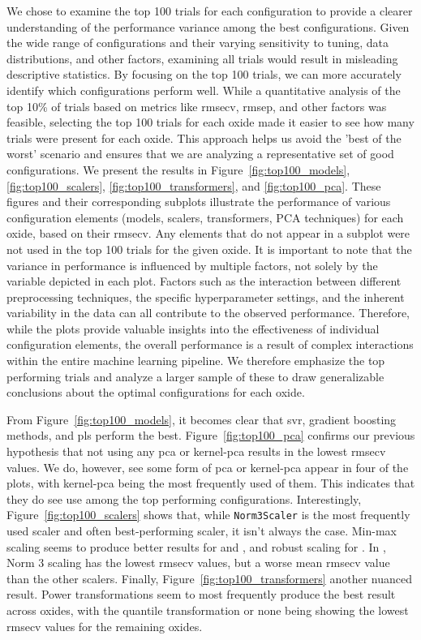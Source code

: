 We chose to examine the top 100 trials for each configuration to provide a clearer understanding of the performance variance among the best configurations.
Given the wide range of configurations and their varying sensitivity to tuning, data distributions, and other factors, examining all trials would result in misleading descriptive statistics.
By focusing on the top 100 trials, we can more accurately identify which configurations perform well.
While a quantitative analysis of the top 10\% of trials based on metrics like \gls{rmsecv}, \gls{rmsep}, and other factors was feasible, selecting the top 100 trials for each oxide made it easier to see how many trials were present for each oxide.
This approach helps us avoid the 'best of the worst' scenario and ensures that we are analyzing a representative set of good configurations.
We present the results in Figure~\ref{fig:top100_models}, \ref{fig:top100_scalers}, \ref{fig:top100_transformers}, and \ref{fig:top100_pca}.
These figures and their corresponding subplots illustrate the performance of various configuration elements (models, scalers, transformers, PCA techniques) for each oxide, based on their \gls{rmsecv}.
Any elements that do not appear in a subplot were not used in the top 100 trials for the given oxide.
It is important to note that the variance in performance is influenced by multiple factors, not solely by the variable depicted in each plot.
Factors such as the interaction between different preprocessing techniques, the specific hyperparameter settings, and the inherent variability in the data can all contribute to the observed performance.
Therefore, while the plots provide valuable insights into the effectiveness of individual configuration elements, the overall performance is a result of complex interactions within the entire machine learning pipeline.
We therefore emphasize the top performing trials and analyze a larger sample of these to draw generalizable conclusions about the optimal configurations for each oxide.

From Figure~\ref{fig:top100_models}, it becomes clear that \gls{svr}, gradient boosting methods, and \gls{pls} perform the best.
Figure~\ref{fig:top100_pca} confirms our previous hypothesis that not using any \gls{pca} or \gls{kernel-pca} results in the lowest \gls{rmsecv} values.
We do, however, see some form of \gls{pca} or \gls{kernel-pca} appear in four of the plots, with \gls{kernel-pca} being the most frequently used of them.
This indicates that they do see use among the top performing configurations.
Interestingly, Figure~\ref{fig:top100_scalers} shows that, while \texttt{Norm3Scaler} is the most frequently used scaler and often best-performing scaler, it isn't always the case.
Min-max scaling seems to produce better results for  and , and robust scaling for .
In , Norm 3 scaling has the lowest \gls{rmsecv} values, but a worse mean \gls{rmsecv} value than the other scalers.
Finally, Figure~\ref{fig:top100_transformers} another nuanced result.
Power transformations seem to most frequently produce the best result across oxides, with the quantile transformation or none being showing the lowest \gls{rmsecv} values for the remaining oxides.

